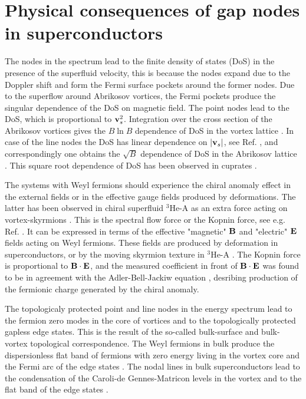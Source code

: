 \documentclass[prb,
superscriptaddress,showpacs,amsmath,amssymb]{revtex4}
\begin{document}
\section{Physical consequences of gap nodes in superconductors}

 The nodes in the spectrum lead to the finite density of states (DoS) in the presence of the superfluid velocity, this is because the nodes expand due to the Doppler shift and form the Fermi surface pockets around the former nodes.  Due to the superflow around Abrikosov vortices, the Fermi pockets produce the singular dependence of the DoS on magnetic field.  The point nodes lead to the DoS, which is proportional to ${\bf v}_s^2$. Integration over the cross section of the Abrikosov vortices gives the $B\ln B$ dependence of DoS  in the vortex lattice \cite{Volovik1988}. In case of the line nodes the DoS has linear dependence on $|{\bf v}_s|$, see Ref. \cite{MuzikarRainer1983}, and correspondingly one obtains  the $\sqrt{B}$ dependence of DoS in the Abrikosov lattice \cite{Volovik1988}. This square root dependence of DoS has been observed in cuprates \cite{Moler1994}.

The systems with Weyl fermions should experience the chiral anomaly effect \cite{Adler,BellJackiw} in the external fields or in the effective gauge fields produced by deformations. The latter has been observed in chiral superfluid $^3$He-A as an extra force acting on vortex-skyrmions \cite{Bevan1997}. This is the spectral flow force or the Kopnin  force, see e.g. Ref. \cite{Kopnin1995}. It can be expressed in terms of the effective "magnetic" ${\bf B}$  and "electric" ${\bf E}$  fields acting on Weyl fermions. These fields are produced by deformation in superconductors, or by the moving skyrmion texture in $^3$He-A \cite{Volovik2003}. The Kopnin force is proportional to ${\bf B}\cdot {\bf E}$, and the measured coefficient in front of ${\bf B}\cdot {\bf E}$ was found to be in agreement with the Adler-Bell-Jackiw equation \cite{Adler,BellJackiw}, desribing production of the fermionic charge generated by the chiral anomaly.  

The topologicaly protected point and line nodes in the energy spectrum lead to the fermion zero modes in the core of vortices and to the topologically protected gapless edge states. This is the result of the so-called bulk-surface and bulk-vortex topological correspondence. The Weyl fermions in bulk produce the dispersionless flat band of fermions with zero energy living in the vortex core \cite{Kopnin1991,Volovik2011} and the Fermi arc of the edge states \cite{Burkov2011,Burkov2011b}. 
The nodal lines in bulk superconductors lead to the condensation of the Caroli-de Gennes-Matricon levels in the vortex \cite{Volovik2016} and to the flat band of the edge states \cite{Ryu2002,SchnyderRyu2011}.
\end{document}
